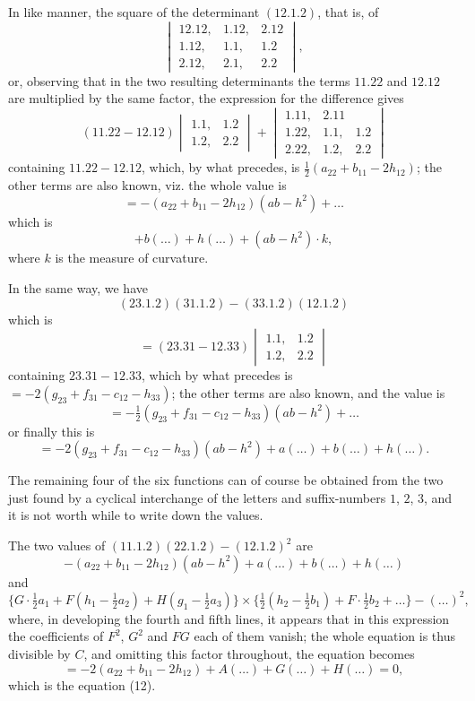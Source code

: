 \documentclass[11pt,a4paper]{article}
\theoremstyle{definition}
\theoremstyle{remark}
\begin{document}
In like manner, the square of the determinant $(12.1.2)$, that is, of
\[
\begin{vmatrix}
12.12, & 1.12, & 2.12 \\
1.12, & 1.1, & 1.2 \\
2.12, & 2.1, & 2.2
\end{vmatrix},
\]
or, observing that in the two resulting determinants the terms $11.22$ and $12.12$ are multiplied by the same factor, the expression for the difference gives
\[
(11.22 - 12.12)
\begin{vmatrix}
1.1, & 1.2 \\
1.2, & 2.2
\end{vmatrix}
+
\begin{vmatrix}
1.11, & 2.11 \\
1.22, & 1.1, & 1.2 \\
2.22, & 1.2, & 2.2
\end{vmatrix}
\]
containing $11.22 - 12.12$, which, by what precedes, is $\tfrac{1}{2}(a_{22} + b_{11} - 2h_{12})$; the other terms are also known, viz. the whole value is
\[
= -(a_{22} + b_{11} - 2h_{12})(ab - h^2) + \ldots
\]
which is
\[
+ b(\ldots) + h(\ldots) + (ab - h^2) \cdot k,
\]
where $k$ is the measure of curvature.

In the same way, we have
\[
(23.1.2)(31.1.2) - (33.1.2)(12.1.2)
\]
which is
\[
= (23.31 - 12.33)
\begin{vmatrix}
1.1, & 1.2 \\
1.2, & 2.2
\end{vmatrix}
\]
containing $23.31 - 12.33$, which by what precedes is $= -2(g_{23} + f_{31} - c_{12} - h_{33})$; the other terms are also known, and the value is
\[
= -\tfrac{1}{2}(g_{23} + f_{31} - c_{12} - h_{33})(ab - h^2) + \ldots
\]
or finally this is
\[
= -2(g_{23} + f_{31} - c_{12} - h_{33})(ab - h^2) + a(\ldots) + b(\ldots) + h(\ldots).
\]

The remaining four of the six functions can of course be obtained from the two just found by a cyclical interchange of the letters and suffix-numbers $1$, $2$, $3$, and it is not worth while to write down the values.

The two values of $(11.1.2)(22.1.2) - (12.1.2)^2$ are
\[
- (a_{22} + b_{11} - 2h_{12})(ab - h^2) + a(\ldots) + b(\ldots) + h(\ldots)
\]
and
\[
\{G \cdot \tfrac{1}{2}a_1 + F(h_1 - \tfrac{1}{2}a_2) + H(g_1 - \tfrac{1}{2}a_3)\} \times \{\tfrac{1}{2}(h_2 - \tfrac{1}{2}b_1) + F \cdot \tfrac{1}{2}b_2 + \ldots\} - (\ldots)^2,
\]
where, in developing the fourth and fifth lines, it appears that in this expression the coefficients of $F^2$, $G^2$ and $FG$ each of them vanish; the whole equation is thus divisible by $C$, and omitting this factor throughout, the equation becomes
\[
= -2(a_{22} + b_{11} - 2h_{12}) + A(\ldots) + G(\ldots) + H(\ldots) = 0,
\]
which is the equation (12).
\end{document}
